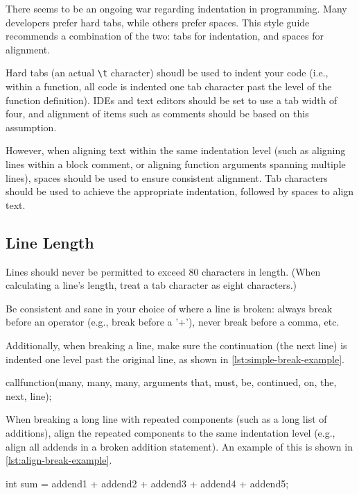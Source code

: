 \documentclass[StyleGuide.tex]{subfiles}
\begin{document}
There seems to be an ongoing war regarding indentation in programming. Many
developers prefer hard tabs, while others prefer spaces. This style guide
recommends a combination of the two: tabs for indentation, and spaces for
alignment.

Hard tabs (an actual \texttt{\textbackslash{}t} character) shoudl be used to
indent your code (i.e., within a function, all code is indented one tab
character past the level of the function definition). IDEs and text editors
should be set to use a tab width of four, and alignment of items such as
comments should be based on this assumption.

However, when aligning text within the same indentation level (such as aligning
lines within a block comment, or aligning function arguments spanning multiple
lines), spaces should be used to ensure consistent alignment. Tab characters
should be used to achieve the appropriate indentation, followed by spaces to
align text.

\subsection{Line Length}\label{subsec:line-length}
Lines should never be permitted to exceed 80 characters in length. (When
calculating a line's length, treat a tab character as eight characters.)

Be consistent and sane in your choice of where a line is broken: always break
before an operator (e.g., break before a '+'), never break before a comma, etc.

Additionally, when breaking a line, make sure the continuation (the next line)
is indented one level past the original line, as shown in
\autoref{lst:simple-break-example}.

\begin{code}[caption=Simple line break example, label=lst:simple-break-example]
callfunction(many, many, many, arguments
    that, must, be, continued, on, the, next,
    line);
\end{code}

When breaking a long line with repeated components (such as a long list of additions),
align the repeated components to the same indentation level (e.g., align all addends
in a broken addition statement). An example of this is shown in
\autoref{lst:align-break-example}.

\begin{code}[caption=Aligned line break example, label=lst:align-break-example]
int sum = addend1
        + addend2
        + addend3
        + addend4
        + addend5;
\end{code}
\end{document}
